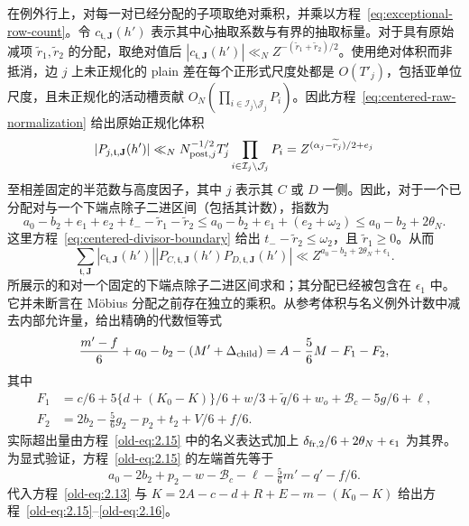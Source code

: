 \documentclass[11pt,a4paper]{article}
\numberwithin{equation}{section}
\numberwithin{figure}{section}
\theoremstyle{definition}
\theoremstyle{remark}
\begin{document}
在例外行上，对每一对已经分配的子项取绝对乘积，并乘以方程~\eqref{eq:exceptional-row-count}。令 \(c_{\mathfrak t,\mathbf J}(h')\) 表示其中心抽取系数与有界的抽取标量。对于具有原始减项 \(\widetilde r_1,\widetilde r_2\) 的分配，取绝对值后 \(|c_{\mathfrak t,\mathbf J}(h')|\ll_N
 Z^{-(\widetilde r_1+\widetilde r_2)/2}\)。使用绝对体积而非抵消，边 \(j\) 上未正规化的 plain 差在每个正形式尺度处都是 \(O(T'_j)\)，包括亚单位尺度，且未正规化的活动槽贡献 \(O_N(\prod_{i\in\mathcal I_j\setminus\mathcal J_j}P_i)\)。因此方程~\eqref{eq:centered-raw-normalization} 给出原始正规化体积
\[
 |P_{j,\mathfrak t,\mathbf J}(h')|
 \ll_N N_{{\rm post},j}^{-1/2}T'_j
             \prod_{i\in\mathcal I_j\setminus\mathcal J_j}P_i
 =Z^{(\alpha_j-\widetilde r_j)/2+e_j}
\]
至相差固定的半范数与高度因子，其中 \(j\) 表示其 \(C\) 或 \(D\) 一侧。因此，对于一个已分配对与一个下端点除子二进区间（包括其计数），指数为
\[
 a_0-b_2+e_1+e_2+t_- -\widetilde r_1-\widetilde r_2
 \le a_0-b_2+e_1+(e_2+\omega_2)
 \le a_0-b_2+2\theta_N.
\]
这里方程~\eqref{eq:centered-divisor-boundary} 给出 \(t_- -\widetilde r_2\le\omega_2\)，且 \(\widetilde r_1\ge0\)。从而
\[
 \sum_{\mathfrak t,\mathbf J}
 |c_{\mathfrak t,\mathbf J}(h')|
 |P_{C,\mathfrak t,\mathbf J}(h')
       P_{D,\mathfrak t,\mathbf J}(h')|
 \ll Z^{a_0-b_2+2\theta_N+\epsilon_1}.
\]
所展示的和对一个固定的下端点除子二进区间求和；其分配已经被包含在 \(\epsilon_1\) 中。它并未断言在 M\"obius 分配之前存在独立的乘积。从参考体积与名义例外计数中减去内部允许量，给出精确的代数恒等式
\begin{equation}
 \frac{m'-f}{6}+a_0-b_2-(M'+\Delta_{\rm child})
 =A-\frac56M-F_1-F_2,
 \label{old-eq:2.15}
\end{equation}
其中
\begin{equation}
 \begin{aligned}
 F_1&=c/6+5\{d+(K_0-K)\}/6+w/3+\widetilde q/6
       +w_o+\mathcal B_c-5g/6+\ell,\\
 F_2&=2b_2-\tfrac56g_2-p_2+t_2+V/6+f/6.
 \end{aligned}
 \label{old-eq:2.16}
\end{equation}
实际超出量由方程~\eqref{old-eq:2.15} 中的名义表达式加上 \(\delta_{{\rm fr},2}/6+2\theta_N+\epsilon_1\) 为其界。
为显式验证，方程~\eqref{old-eq:2.15} 的左端首先等于
\[
 a_0-2b_2+p_2-w-\mathcal B_c-\ell
       -\tfrac56m'-q'-f/6.
\]
代入方程~\eqref{old-eq:2.13} 与 \(K=2A-c-d+R+E-m-(K_0-K)\) 给出方程~\eqref{old-eq:2.15}--\eqref{old-eq:2.16}。
\end{document}
